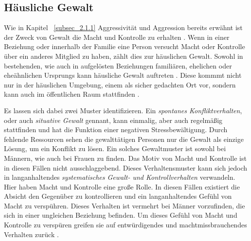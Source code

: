 \subsection{Häusliche Gewalt}    \label{subsec_2.1.2}
Wie in Kapitel ~\ref{subsec_2.1.1} Aggressivität und Aggression bereits erwähnt ist der Zweck von Gewalt die Macht und Kontrolle zu erhalten \parencite{Def_Aggressivität_vs_violence}. Wenn in einer Beziehung oder innerhalb der Familie eine Person versucht Macht oder Kontrolle über ein anderes Mitglied zu haben, zählt dies zur häuslichen Gewalt. Sowohl in bestehenden, wie auch in aufgelösten Beziehungen familiären, ehelichen oder eheähnlichen Ursprungs kann häusliche Gewalt auftreten \parencite{Def_haus_Gewalt, Def_haus_Gewalt_2}. Diese kommmt nicht nur in der häuslichen Umgebung, einem als sicher gedachten Ort vor, sondern kann auch im öffentlichen Raum stattfinden \parencite{Gewaltarten_WHO}. 

Es lassen sich dabei zwei Muster identifizieren. Ein \textit{spontanes Konfliktverhalten}, oder auch \textit{situative Gewalt} gennant, kann einmalig, aber auch regelmäßig stattfinden und hat die Funktion einer negativen Stressbewältigung. Durch fehlende Ressourcen sehen die gewalttätigen Personen nur die Gewalt als einzige Lösung, um ein Konflikt zu lösen. Ein solches Gewaltmuster ist sowohl bei Männern, wie auch bei Frauen zu finden. Das Motiv von Macht und Kontrolle ist in diesen Fällen nicht ausschlaggebend. Dieses Verhaltensmuster kann sich jedoch in langanhaltendes \textit{systematisches Gewalt- und Kontrollverhalten} verwandeln. Hier haben Macht und Kontrolle eine große Rolle. In diesen Fällen existiert die Absicht den Gegenüber zu kontrollieren und ein langanhaltendes Gefühl von Macht zu verspühren. Dieses Verhalten ist vermehrt bei Männer vorzufinden, die sich in einer ungleichen Beziehung befinden. Um dieses Gefühl von Macht und Kontrolle zu verspüren greifen sie auf entwürdigendes und machtmissbrauchendes Verhalten zurück \parencite{Def_Form_Folge_Gewalt}.

